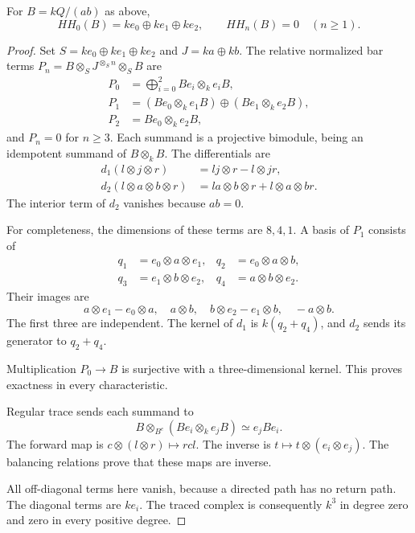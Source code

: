\begin{proposition}
\label{v4-arith:traces:directed-model}
For $B=kQ/(ab)$ as above,
\[
 HH_0(B)=ke_0\oplus ke_1\oplus ke_2,\qquad
 HH_n(B)=0\quad(n\geq1).
\]
\end{proposition}
\begin{proof}
Set $S=ke_0\oplus ke_1\oplus ke_2$ and $J=ka\oplus kb$. The relative
normalized bar terms $P_n=B\otimes_S J^{\otimes_S n}\otimes_S B$ are
\begin{align*}
 P_0&=\bigoplus_{i=0}^2 Be_i\otimes_k e_iB,\\
 P_1&=(Be_0\otimes_k e_1B)\oplus(Be_1\otimes_k e_2B),\\
 P_2&=Be_0\otimes_k e_2B,
\end{align*}
and $P_n=0$ for $n\geq3$. Each summand is a projective bimodule, being an
idempotent summand of $B\otimes_k B$. The differentials are
\begin{align*}
 d_1(l\otimes j\otimes r)&=lj\otimes r-l\otimes jr,\\
 d_2(l\otimes a\otimes b\otimes r)
   &=la\otimes b\otimes r+l\otimes a\otimes br.
\end{align*}
The interior term of $d_2$ vanishes because $ab=0$.

For completeness, the dimensions of these terms are $8,4,1$. A basis of
$P_1$ consists of
\begin{align*}
 q_1&=e_0\otimes a\otimes e_1,&
 q_2&=e_0\otimes a\otimes b,\\
 q_3&=e_1\otimes b\otimes e_2,&
 q_4&=a\otimes b\otimes e_2.
\end{align*}
Their images are
\[
 a\otimes e_1-e_0\otimes a,\quad a\otimes b,\quad
 b\otimes e_2-e_1\otimes b,\quad -a\otimes b.
\]
The first three are independent. The kernel of $d_1$ is $k(q_2+q_4)$, and
$d_2$ sends its generator to $q_2+q_4$.

Multiplication $P_0\to B$ is surjective with a three-dimensional kernel.
This proves exactness in every characteristic.

Regular trace sends each summand to
\[
 B\otimes_{B^e}(Be_i\otimes_k e_jB)\simeq e_jBe_i.
\]
The forward map is $c\otimes(l\otimes r)\mapsto rcl$. The inverse is
$t\mapsto t\otimes(e_i\otimes e_j)$. The balancing relations prove that
these maps are inverse.

All off-diagonal terms here vanish, because a directed path has no return
path. The diagonal terms are $ke_i$. The traced complex is consequently
$k^3$ in degree zero and zero in every positive degree.
\end{proof}

